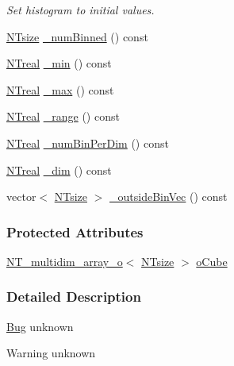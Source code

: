 \begin{DoxyCompactItemize}
\begin{DoxyCompactList}\small\item\em Set histogram to initial values. \item\end{DoxyCompactList}\item 
\hyperlink{nt__types_8h_a06c124f2e4469769b58230253ce0560b}{NTsize} \hyperlink{class_n_t__multidim__histogram__o_a27c831a3449d64c90400ed8c71b8b158}{\_\-numBinned} () const 
\item 
\hyperlink{nt__types_8h_a814a97893e9deb1eedcc7604529ba80d}{NTreal} \hyperlink{class_n_t__multidim__histogram__o_a171d631de76b4fc128691fc05b779471}{\_\-min} () const 
\item 
\hyperlink{nt__types_8h_a814a97893e9deb1eedcc7604529ba80d}{NTreal} \hyperlink{class_n_t__multidim__histogram__o_a5d854b22e355d0ac1bb7f1fa2994ee35}{\_\-max} () const 
\item 
\hyperlink{nt__types_8h_a814a97893e9deb1eedcc7604529ba80d}{NTreal} \hyperlink{class_n_t__multidim__histogram__o_ad47975cfa7738aa53530dc10e7f16e12}{\_\-range} () const 
\item 
\hyperlink{nt__types_8h_a814a97893e9deb1eedcc7604529ba80d}{NTreal} \hyperlink{class_n_t__multidim__histogram__o_ab72cd9a59bb4b4f931aa6069e067d19f}{\_\-numBinPerDim} () const 
\item 
\hyperlink{nt__types_8h_a814a97893e9deb1eedcc7604529ba80d}{NTreal} \hyperlink{class_n_t__multidim__histogram__o_a1bad7a6f2a5d67e334d0a95184202a96}{\_\-dim} () const 
\item 
vector$<$ \hyperlink{nt__types_8h_a06c124f2e4469769b58230253ce0560b}{NTsize} $>$ \hyperlink{class_n_t__multidim__histogram__o_a50cd84c0f96d38cc4f70cce186cad626}{\_\-outsideBinVec} () const 
\end{DoxyCompactItemize}
\subsubsection*{Protected Attributes}
\begin{DoxyCompactItemize}
\item 
\hyperlink{class_n_t__multidim__array__o}{NT\_\-multidim\_\-array\_\-o}$<$ \hyperlink{nt__types_8h_a06c124f2e4469769b58230253ce0560b}{NTsize} $>$ \hyperlink{class_n_t__multidim__histogram__o_aa327294367e604b49652940c36b3bce6}{oCube}
\end{DoxyCompactItemize}


\subsubsection{Detailed Description}
\begin{Desc}
\item[\hyperlink{bug__bug000106}{Bug}]unknown \end{Desc}
\begin{DoxyWarning}{Warning}
unknown 
\end{DoxyWarning}


